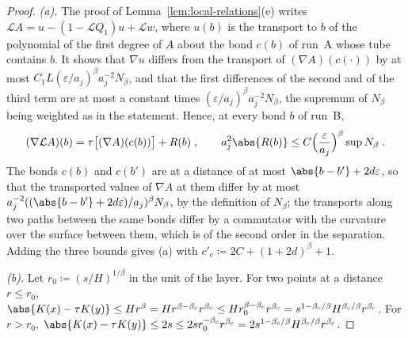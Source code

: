 \begin{proof}
\emph{(a).} The proof of Lemma~\ref{lem:local-relations}(e) writes $\mathcal LA = u - (1 - \mathcal LQ_1)u + \mathcal Lw$, where $u(b)$ is the transport to $b$ of the polynomial of the first degree of $A$ about the bond $c(b)$ of run~A whose tube contains $b$. It shows that $\nabla u$ differs from the transport of $(\nabla A)(c(\cdot))$ by at most $C_1L(\varepsilon/a_j)^\beta a_j^{-2}N_\beta$, and that the first differences of the second and of the third term are at most a constant times $(\varepsilon/a_j)^\beta a_j^{-2}N_\beta$, the supremum of $N_\beta$ being weighted as in the statement. Hence, at every bond $b$ of run~B,
\[
    (\nabla\mathcal LA)(b) = \tau\bigl[(\nabla A)(c(b))\bigr] + R(b)\;,
    \qquad
    a_j^2\abs{R(b)} \leq C\Bigl(\frac{\varepsilon}{a_j}\Bigr)^\beta\sup N_\beta\;.
\]
The bonds $c(b)$ and $c(b')$ are at a distance of at most $\abs{b - b'} + 2d\varepsilon$, so that the transported values of $\nabla A$ at them differ by at most $a_j^{-2}((\abs{b - b'} + 2d\varepsilon)/a_j)^\beta N_\beta$, by the definition of $N_\beta$; the transports along two paths between the same bonds differ by a commutator with the curvature over the surface between them, which is of the second order in the separation. Adding the three bounds gives (a) with $c'_e \coloneqq 2C + (1 + 2d)^\beta + 1$.

\emph{(b).} Let $r_0 \coloneqq (s/H)^{1/\beta}$ in the unit of the layer. For two points at a distance $r \leq r_0$, $\abs{K(x) - \tau K(y)} \leq Hr^\beta = Hr^{\beta-\beta_c}r^{\beta_c} \leq Hr_0^{\beta-\beta_c}r^{\beta_c} = s^{1-\beta_c/\beta}H^{\beta_c/\beta}r^{\beta_c}$. For $r > r_0$, $\abs{K(x) - \tau K(y)} \leq 2s \leq 2sr_0^{-\beta_c}r^{\beta_c} = 2s^{1-\beta_c/\beta}H^{\beta_c/\beta}r^{\beta_c}$.
\end{proof}



